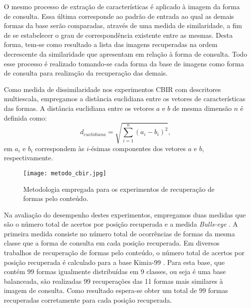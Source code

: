 O mesmo processo de extração de características é aplicado à imagem da forma de consulta. Essa última corresponde ao padrão de entrada ao qual as demais formas da base serão comparadas, através de uma medida de similaridade, a fim de se estabelecer o grau de correspondência existente entre as mesmas. Desta forma, tem-se como resultado a lista das imagens recuperadas na ordem decrescente da similaridade que apresentam em relação à forma de consulta. Todo esse processo é realizado tomando-se cada forma da base de imagens como forma de consulta para realização da recuperação das demais.

Como medida de dissimilaridade nos experimentos \ac{CBIR} com descritores multiescala, empregamos a distância  euclidiana entre os vetores de características das formas. A distância euclidiana entre os vetores $a$ e $b$ de mesma dimensão $n$ é definida como: %
\begin{equation}
\label{eq:dist_euclidiana}
{d}_{euclidiana} = \sqrt{\sum_{i=1}^{n}{({a}_{i}-{b}_{i})}^{2}},
\end{equation}
em ${a}_{i}$ e ${b}_{i}$ correspondem às $i$-ésimas componentes dos vetores $a$ e $b$, respectivamente.


\begin{figure}[h!]
\caption{\label{fig:metodo_cbir} Metodologia empregada para os experimentos de recuperação de formas pelo conteúdo.}
  \centering
  \texttt{[image: metodo\_cbir.jpg]}
\end{figure}



Na avaliação do desempenho destes experimentos, empregamos duas medidas que são  o número total de acertos por posição recuperada e a medida \textit{Bulls-eye} \cite{Ling:2007:SCU:1191552.1191806,855850}.
A primeira medida consiste no número total de ocorrências de formas da mesma classe que a forma de consulta em cada posição recuperada.  Em diversos trabalhos de recuperação de formas pelo conteúdo, o número total de acertos por posição recuperada é calculado para a base Kimia-99 \cite{Bernier:2003}. Para esta base, que contém 99 formas igualmente distribuídas em 9 classes, ou seja é uma base balanceada, são realizadas 99 recuperações das 11 formas mais similares à imagem de consulta. Como resultado espera-se obter um total de 99 formas recuperadas corretamente para cada posição recuperada.

